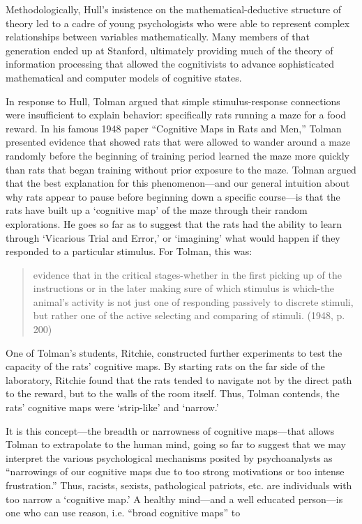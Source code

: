 Methodologically, Hull's insistence on the mathematical-deductive structure of theory led to a cadre of young psychologists who were able to represent complex relationships between variables mathematically. Many members of that generation ended up at Stanford, ultimately providing much of the theory of information processing that allowed the cognitivists to advance sophisticated mathematical and computer models of cognitive states.

In response to Hull, Tolman argued that simple stimulus-response connections were insufficient to explain behavior: specifically rats running a maze for a food reward. In his famous 1948 paper ``Cognitive Maps in Rats and Men,'' Tolman presented evidence that showed rats that were allowed to wander around a maze randomly before the beginning of training period learned the maze more quickly than rats that began training without prior exposure to the maze. Tolman argued that the best explanation for this phenomenon---and our general intuition about why rats appear to pause before beginning down a specific course---is that the rats have built up a `cognitive map' of the maze through their random explorations. He goes so far as to suggest that the rats had the ability to learn through `Vicarious Trial and Error,' or `imagining' what would happen if they responded to a particular stimulus. For Tolman, this was:

\begin{quote}

evidence that in the critical stages-whether in the first picking up of the instructions or in the later making sure of which stimulus is which-the animal's activity is not just one of responding passively to discrete stimuli, but rather one of the active selecting and comparing of stimuli. (1948, p. 200)
\end{quote}

One of Tolman's students, Ritchie, constructed further experiments to test the capacity of the rats' cognitive maps. By starting rats on the far side of the laboratory, Ritchie found that the rats tended to navigate not by the direct path to the reward, but to the walls of the room itself. Thus, Tolman contends, the rats' cognitive maps were `strip-like' and `narrow.'

It is this concept---the breadth or narrowness of cognitive maps---that allows Tolman to extrapolate to the human mind, going so far to suggest that we may interpret the various psychological mechanisms posited by psychoanalysts as ``narrowings of our cognitive maps due to too strong motivations or too intense frustration.'' Thus, racists, sexists, pathological patriots, etc. are individuals with too narrow a `cognitive map.' A healthy mind---and a well educated person---is one who can use reason, i.e. ``broad cognitive maps'' to


